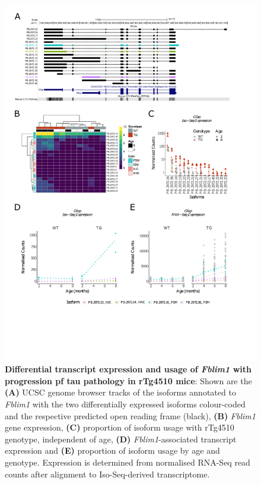 \begin{figure}[!htp]
	\centering
	\includegraphics[page=6,trim={1.5cm 3cm 2cm 1cm}, scale = 0.80]{Figures/Ch5_DiffPlots.pdf}
	\captionsetup{width=0.95\textwidth}
	\caption[Differential \textit{Fblim1} transcript expression and usage]%
	{\textbf{Differential transcript expression and usage of \textit{Fblim1} with progression pf tau pathology in rTg4510 mice}: Shown are the \textbf{(A)} UCSC genome browser tracks of the isoforms annotated to \textit{Fblim1} with the two differentially expressed isoforms colour-coded and the respective predicted open reading frame (black), \textbf{(B)} \textit{Fblim1} gene expression, \textbf{(C)} proportion of isoform usage with rTg4510 genotype, independent of age, \textbf{(D)} \textit{Fblim1}-associated transcript expression and \textbf{(E)} proportion of isoform usage by age and genotype. Expression is determined from normalised RNA-Seq read counts after alignment to Iso-Seq-derived transcriptome.} 
	\label{fig:DIU_fblim1}
\end{figure}


